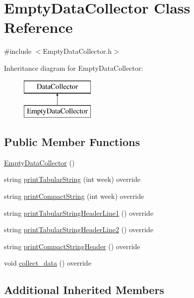 \hypertarget{classEmptyDataCollector}{}\section{Empty\+Data\+Collector Class Reference}
\label{classEmptyDataCollector}


{\ttfamily \#include $<$Empty\+Data\+Collector.\+h$>$}

Inheritance diagram for Empty\+Data\+Collector\+:\begin{figure}[H]
\begin{center}
\leavevmode
\includegraphics[height=2.000000cm]{classEmptyDataCollector}
\end{center}
\end{figure}
\subsection*{Public Member Functions}
\begin{DoxyCompactItemize}
\item 
\mbox{\hyperlink{classEmptyDataCollector_ae6ec59ac659f009c76525f00c5319524}{Empty\+Data\+Collector}} ()
\item 
string \mbox{\hyperlink{classEmptyDataCollector_a2bb44e454376ed518c4d89cf324b8bd7}{print\+Tabular\+String}} (int week) override
\item 
string \mbox{\hyperlink{classEmptyDataCollector_ad4a4ebbf610b3939e34442795a392dd5}{print\+Compact\+String}} (int week) override
\item 
string \mbox{\hyperlink{classEmptyDataCollector_afa47b48abb2ed59c16f1253e55f93cf2}{print\+Tabular\+String\+Header\+Line1}} () override
\item 
string \mbox{\hyperlink{classEmptyDataCollector_aa71282121251d344d674223409445be9}{print\+Tabular\+String\+Header\+Line2}} () override
\item 
string \mbox{\hyperlink{classEmptyDataCollector_a345d478e92af2ab4bcbaeeae3c7a3faa}{print\+Compact\+String\+Header}} () override
\item 
void \mbox{\hyperlink{classEmptyDataCollector_a2993f4e00acd2eff18bed2e39108e89f}{collect\+\_\+data}} () override
\end{DoxyCompactItemize}
\subsection*{Additional Inherited Members}


